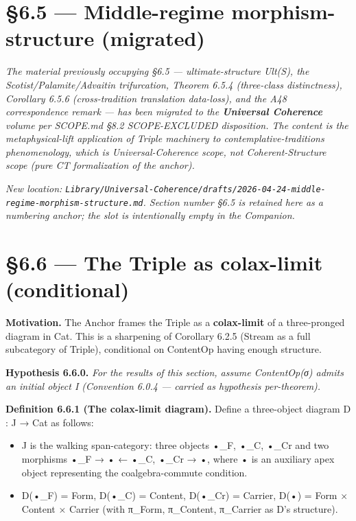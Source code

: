 \documentclass[11pt, openany]{book}
\newcommand{\sectionbreak}{\clearpage}
\begin{document}
\sectionbreak

\section{§6.5 --- Middle-regime morphism-structure (migrated)}

\textit{The material previously occupying §6.5 --- ultimate-structure Ult(S), the Scotist/Palamite/Advaitin trifurcation, Theorem 6.5.4 (three-class distinctness), Corollary 6.5.6 (cross-tradition translation data-loss), and the A48 correspondence remark --- has been migrated to the \textbf{Universal Coherence} volume per SCOPE.md §8.2 SCOPE-EXCLUDED disposition. The content is the metaphysical-lift application of Triple machinery to contemplative-traditions phenomenology, which is Universal-Coherence scope, not Coherent-Structure scope (pure CT formalization of the anchor).}

\textit{New location: \texttt{Library/Universal-Coherence/drafts/2026-04-24-middle-regime-morphism-structure.md}. Section number §6.5 is retained here as a numbering anchor; the slot is intentionally empty in the Companion.}

\sectionbreak

\section{§6.6 --- The Triple as colax-limit (conditional)}

\textbf{Motivation.} The Anchor frames the Triple as a \textbf{colax-limit} of a three-pronged diagram in Cat. This is a sharpening of Corollary 6.2.5 (Stream as a full subcategory of Triple), conditional on ContentOp having enough structure.

\textbf{Hypothesis 6.6.0.} \textit{For the results of this section, assume ContentOp(σ) admits an initial object I (Convention 6.0.4 --- carried as hypothesis per-theorem).}

\textbf{Definition 6.6.1 (The colax-limit diagram).} Define a three-object diagram D : J → Cat as follows:

\begin{itemize}
\item J is the walking span-category: three objects {•\_\allowbreak{}F, •\_\allowbreak{}C, •\_\allowbreak{}Cr} and two morphisms •\_\allowbreak{}F → • ← •\_\allowbreak{}C, •\_\allowbreak{}Cr → •, where • is an auxiliary apex object representing the coalgebra-commute condition.
\item D(•\_\allowbreak{}F) = Form, D(•\_\allowbreak{}C) = Content, D(•\_\allowbreak{}Cr) = Carrier, D(•) = Form × Content × Carrier (with π\_\allowbreak{}Form, π\_\allowbreak{}Content, π\_\allowbreak{}Carrier as D's structure).
\end{itemize}
\end{document}
